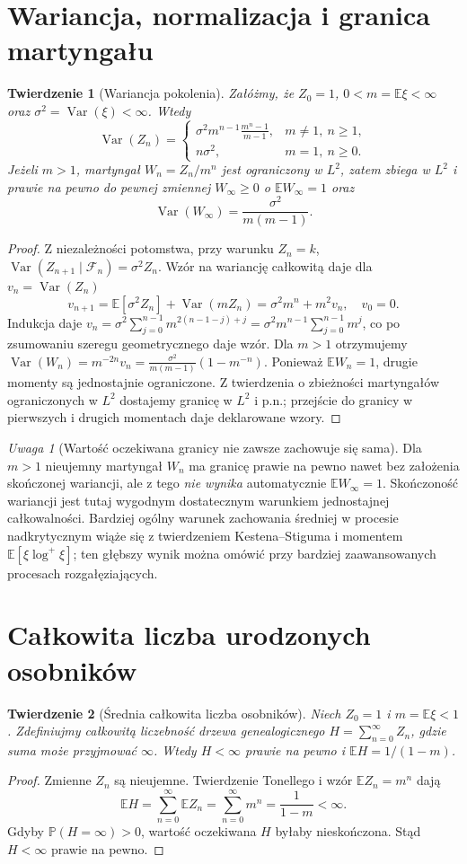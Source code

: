 \documentclass[11pt,a4paper,oneside]{report}
\numberwithin{equation}{chapter}
\theoremstyle{plain}
\newtheorem{twierdzenie}{Twierdzenie}[chapter]
\theoremstyle{definition}
\theoremstyle{remark}
\newtheorem{uwaga}{Uwaga}[chapter]
\newcommand{\Prob}{\mathbb{P}}
\newcommand{\E}{\mathbb{E}}
\newcommand{\Var}{\operatorname{Var}}
\newcommand{\calF}{\mathcal{F}}
\begin{document}
\section{Wariancja, normalizacja i granica martyngału}
\begin{twierdzenie}[Wariancja pokolenia]
Załóżmy, że $Z_0=1$, $0<m=\E\xi<\infty$ oraz
$\sigma^2=\Var(\xi)<\infty$. Wtedy
\[
\Var(Z_n)=
\begin{cases}
\displaystyle \sigma^2m^{n-1}\frac{m^n-1}{m-1},&m\ne1,\ n\ge1,\\[6pt]
 n\sigma^2,&m=1,\ n\ge0.
\end{cases}
\]
Jeżeli $m>1$, martyngał $W_n=Z_n/m^n$ jest ograniczony
w $L^2$, zatem zbiega w $L^2$ i prawie na pewno do
pewnej zmiennej $W_\infty\ge0$ o $\E W_\infty=1$ oraz
\[
\Var(W_\infty)=\frac{\sigma^2}{m(m-1)}.
\]
\end{twierdzenie}
\begin{proof}
Z niezależności potomstwa, przy warunku $Z_n=k$,
$\Var(Z_{n+1}\mid\calF_n)=\sigma^2Z_n$.
Wzór na wariancję całkowitą daje dla $v_n=\Var(Z_n)$
\[
v_{n+1}=\E[\sigma^2Z_n]
+\Var(mZ_n)=\sigma^2m^n+m^2v_n,
\quad v_0=0.
\]
Indukcja daje
$v_n=\sigma^2\sum_{j=0}^{n-1}m^{2(n-1-j)+j}
=\sigma^2m^{n-1}\sum_{j=0}^{n-1}m^j$,
co po zsumowaniu szeregu geometrycznego daje wzór.
Dla $m>1$ otrzymujemy
$\Var(W_n)=m^{-2n}v_n
=\frac{\sigma^2}{m(m-1)}(1-m^{-n})$.
Ponieważ $\E W_n=1$, drugie momenty są jednostajnie
ograniczone. Z twierdzenia o zbieżności martyngałów
ograniczonych w $L^2$ dostajemy granicę w $L^2$ i p.n.;
przejście do granicy w pierwszych i drugich momentach daje
deklarowane wzory.
\end{proof}

\begin{uwaga}[Wartość oczekiwana granicy nie zawsze zachowuje się sama]
Dla $m>1$ nieujemny martyngał $W_n$ ma granicę prawie na pewno
nawet bez założenia skończonej wariancji, ale z tego
\emph{nie wynika} automatycznie $\E W_\infty=1$.
Skończoność wariancji jest tutaj wygodnym dostatecznym
warunkiem jednostajnej całkowalności. Bardziej ogólny
warunek zachowania średniej w procesie nadkrytycznym
wiąże się z twierdzeniem Kestena--Stiguma i momentem
$\E[\xi\log^+\xi]$; ten głębszy wynik można omówić
przy bardziej zaawansowanych procesach rozgałęziających.
\end{uwaga}

\section{Całkowita liczba urodzonych osobników}
\begin{twierdzenie}[Średnia całkowita liczba osobników]
Niech $Z_0=1$ i $m=\E\xi<1$.
Zdefiniujmy całkowitą liczebność drzewa genealogicznego
$H=\sum_{n=0}^\infty Z_n$, gdzie suma może przyjmować $\infty$.
Wtedy $H<\infty$ prawie na pewno i
$\E H=1/(1-m)$.
\end{twierdzenie}
\begin{proof}
Zmienne $Z_n$ są nieujemne. Twierdzenie Tonellego
i wzór $\E Z_n=m^n$ dają
\[
\E H=\sum_{n=0}^\infty\E Z_n=\sum_{n=0}^\infty m^n
=\frac{1}{1-m}<\infty.
\]
Gdyby $\Prob(H=\infty)>0$, wartość oczekiwana $H$
byłaby nieskończona. Stąd $H<\infty$ prawie na pewno.
\end{proof}
\end{document}
